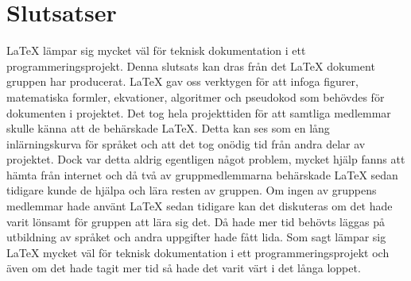 \section{Slutsatser}
{\LaTeX} lämpar sig mycket väl för teknisk dokumentation i ett programmeringsprojekt. Denna slutsats kan dras från det {\LaTeX} dokument gruppen har producerat. {\LaTeX} gav oss verktygen för att infoga figurer, matematiska formler, ekvationer, algoritmer och pseudokod som behövdes för dokumenten i projektet.   
\newline
\newline
Det tog hela projekttiden för att samtliga medlemmar skulle känna att de behärskade {\LaTeX}. Detta kan ses som en lång inlärningskurva för språket och att det tog onödig tid från andra delar av projektet. Dock var detta aldrig egentligen något problem, mycket hjälp fanns att hämta från internet och då två av gruppmedlemmarna behärskade {\LaTeX} sedan tidigare kunde de hjälpa och lära resten av gruppen. 
\newline
\newline
Om ingen av gruppens medlemmar hade använt {\LaTeX} sedan tidigare kan det diskuteras om det hade varit lönsamt för gruppen att lära sig det. Då hade mer tid behövts läggas på utbildning av språket och andra uppgifter hade fått lida. Som sagt lämpar sig {\LaTeX} mycket väl för teknisk dokumentation i ett programmeringsprojekt och även om det hade tagit mer tid så hade det varit värt i det långa loppet.    